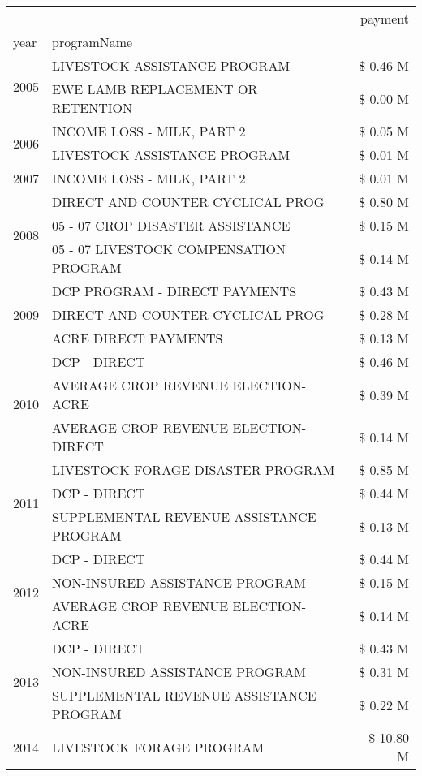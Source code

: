 \begin{tabular}{llr}
\toprule
 &  & payment \\
year & programName &  \\
\midrule
\multirow[t]{2}{*}{2005} & LIVESTOCK ASSISTANCE PROGRAM & \$ 0.46 M \\
 & EWE LAMB REPLACEMENT OR RETENTION & \$ 0.00 M \\
\cline{1-3}
\multirow[t]{2}{*}{2006} & INCOME LOSS - MILK, PART 2 & \$ 0.05 M \\
 & LIVESTOCK ASSISTANCE PROGRAM & \$ 0.01 M \\
\cline{1-3}
2007 & INCOME LOSS - MILK, PART 2 & \$ 0.01 M \\
\cline{1-3}
\multirow[t]{3}{*}{2008} & DIRECT AND COUNTER CYCLICAL PROG & \$ 0.80 M \\
 & 05 - 07 CROP DISASTER ASSISTANCE & \$ 0.15 M \\
 & 05 - 07 LIVESTOCK COMPENSATION PROGRAM & \$ 0.14 M \\
\cline{1-3}
\multirow[t]{3}{*}{2009} & DCP PROGRAM - DIRECT PAYMENTS & \$ 0.43 M \\
 & DIRECT AND COUNTER CYCLICAL PROG & \$ 0.28 M \\
 & ACRE DIRECT PAYMENTS & \$ 0.13 M \\
\cline{1-3}
\multirow[t]{3}{*}{2010} & DCP - DIRECT & \$ 0.46 M \\
 & AVERAGE CROP REVENUE ELECTION-ACRE & \$ 0.39 M \\
 & AVERAGE CROP REVENUE ELECTION-DIRECT & \$ 0.14 M \\
\cline{1-3}
\multirow[t]{3}{*}{2011} & LIVESTOCK FORAGE DISASTER PROGRAM & \$ 0.85 M \\
 & DCP - DIRECT & \$ 0.44 M \\
 & SUPPLEMENTAL REVENUE ASSISTANCE PROGRAM & \$ 0.13 M \\
\cline{1-3}
\multirow[t]{3}{*}{2012} & DCP - DIRECT & \$ 0.44 M \\
 & NON-INSURED ASSISTANCE PROGRAM & \$ 0.15 M \\
 & AVERAGE CROP REVENUE ELECTION-ACRE & \$ 0.14 M \\
\cline{1-3}
\multirow[t]{3}{*}{2013} & DCP - DIRECT & \$ 0.43 M \\
 & NON-INSURED ASSISTANCE PROGRAM & \$ 0.31 M \\
 & SUPPLEMENTAL REVENUE ASSISTANCE PROGRAM & \$ 0.22 M \\
\cline{1-3}
\multirow[t]{3}{*}{2014} & LIVESTOCK FORAGE PROGRAM & \$ 10.80 M \\

\end{tabular}
